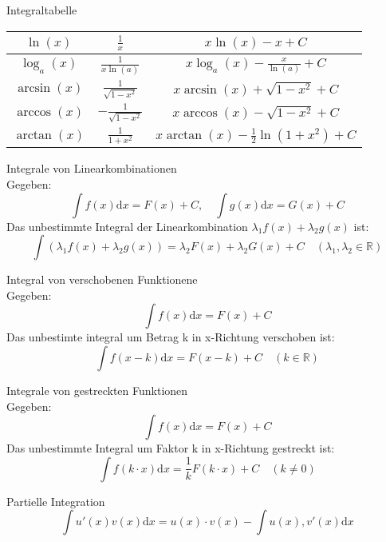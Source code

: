 \begin{lemma}{Integraltabelle}
{\begin{tabular}{|c|c|c|}
			\hline
			\(\ln(x)\)                                & \(\frac{1}{x}\)                           & \(x\ln(x)-x+C\)                         \\
			\hline
			\(\log_a(x)\)                             & \(\frac{1}{x\ln(a)}\)                     & \(x\log_a(x)-\frac{x}{\ln(a)}+C\)       \\
			\hline
			\(\arcsin(x)\)                            & \(\frac{1}{\sqrt{1-x^2}}\)                & \(x\arcsin(x)+\sqrt{1-x^2}+C\)          \\
			\hline
			\(\arccos(x)\)                            & \(-\frac{1}{\sqrt{1-x^2}}\)               & \(x\arccos(x)-\sqrt{1-x^2}+C\)          \\
			\hline
			\(\arctan(x)\)                            & \(\frac{1}{1+x^2}\)                       & \(x\arctan(x)-\frac{1}{2}\ln(1+x^2)+C\) \\
			\hline
		\end{tabular}
	}
\end{lemma}
\begin{lemma}{Integrale von Linearkombinationen}\\
	Gegeben:
	\[\int{f(x)\mathrm{d}x} = F(x)+C, \quad  \int{g(x)\mathrm{d}x} = G(x)+C\]
	Das unbestimmte Integral der Linearkombination \(\lambda_1f(x) + \lambda_2g(x)\) ist:
	\[\int{(\lambda_1f(x)+\lambda_2g(x))} = \lambda_2F(x)+\lambda_2G(x)+C \quad (\lambda_1,\lambda_2 \in \mathbb{R} )\]
\end{lemma}
\begin{lemma}{Integral von verschobenen Funktionene}\\
	Gegeben:
	\[\int{f(x)\mathrm{d}x} = F(x) + C \]
	Das unbestimte integral um Betrag k in x-Richtung verschoben ist:
	\[\int{f(x-k)\mathrm{d}x}= F(x-k)+C \quad (k \in \mathbb{R}) \]
\end{lemma}
\begin{lemma}{Integrale von gestreckten Funktionen}\\
	Gegeben:
	\[\int{f(x)\mathrm{d}x} = F(x)+C \]
	Das unbestimmte Integral um Faktor k in x-Richtung gestreckt ist:
	\[\int{f(k\cdot x)\mathrm{d}x}= \frac{1}{k}F(k\cdot x)+C \quad (k\neq0 )\]
\end{lemma}
\begin{theorem}{Partielle Integration}\\
	\[\int{u'(x)v(x)\mathrm{d}x} = u(x)\cdot v(x) - \int{u(x),v'(x)\mathrm{d}x} \]
\end{theorem}
